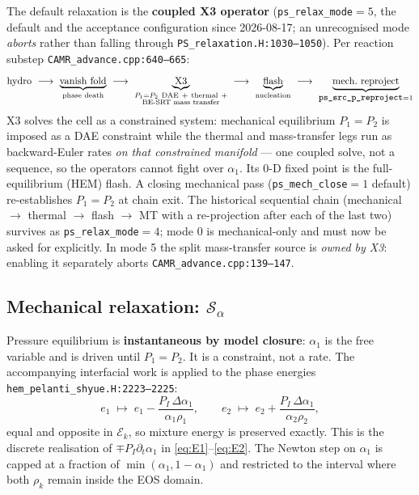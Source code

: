 \documentclass[11pt,a4paper]{article}
\newcommand{\code}[1]{\texttt{\small #1}}
\newcommand{\src}[1]{{\color{gray}\code{#1}}}
\begin{document}
The default relaxation is the \textbf{coupled X3 operator}
(\code{ps\_relax\_mode}$=5$, the default and the acceptance configuration
since 2026-08-17; an unrecognised mode \emph{aborts} rather than falling
through \src{PS\_relaxation.H:1030--1050}).  Per reaction substep
\src{CAMR\_advance.cpp:640--665}:
\begin{equation}
  \text{hydro}\ \longrightarrow\
  \underbrace{\text{vanish fold}}_{\text{phase death}}\ \longrightarrow\
  \underbrace{\text{X3}}_{\substack{P_1=P_2\ \text{DAE}\ +\ \text{thermal}\ +\\
                                    \text{BE-SRT mass transfer}}}\ \longrightarrow\
  \underbrace{\text{flash}}_{\text{nucleation}}\ \longrightarrow\
  \underbrace{\text{mech.\ reproject}}_{\code{ps\_src\_p\_reproject}=1}
  \label{eq:chain}
\end{equation}
X3 solves the cell as a constrained system: mechanical equilibrium
$P_1\!=\!P_2$ is imposed as a DAE constraint while the thermal and
mass-transfer legs run as backward-Euler rates \emph{on that constrained
manifold} --- one coupled solve, not a sequence, so the operators cannot
fight over $\alpha_1$.  Its 0-D fixed point is the full-equilibrium (HEM)
flash.  A closing mechanical pass (\code{ps\_mech\_close}$=1$ default)
re-establishes $P_1=P_2$ at chain exit.  The historical sequential chain
(mechanical $\to$ thermal $\to$ flash $\to$ MT with a re-projection after
each of the last two) survives as \code{ps\_relax\_mode}$=4$; mode 0 is
mechanical-only and must now be asked for explicitly.  In mode 5 the split
mass-transfer source is \emph{owned by X3}: enabling it separately aborts
\src{CAMR\_advance.cpp:139--147}.

\subsection{Mechanical relaxation: $\mathcal{S}_\alpha$}

Pressure equilibrium is \textbf{instantaneous by model closure}: $\alpha_1$ is
the free variable and is driven until $P_1=P_2$.  It is a constraint, not a
rate.  The accompanying interfacial work is applied to the phase energies
\src{hem\_pelanti\_shyue.H:2223--2225}:
\begin{equation}
  e_1 \;\mapsto\; e_1 - \frac{P_{\!I}\,\Delta\alpha_1}{\alpha_1\rho_1},
  \qquad
  e_2 \;\mapsto\; e_2 + \frac{P_{\!I}\,\Delta\alpha_1}{\alpha_2\rho_2},
  \label{eq:mechwork}
\end{equation}
equal and opposite in $\mathcal{E}_k$, so mixture energy is preserved
exactly.  This is the discrete realisation of $\mp P_{\!I}\partial_t\alpha_1$
in \eqref{eq:E1}--\eqref{eq:E2}.  The Newton step on $\alpha_1$ is capped at a
fraction of $\min(\alpha_1,1-\alpha_1)$ and restricted to the interval where
both $\rho_k$ remain inside the EOS domain.
\end{document}
